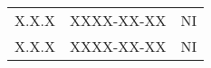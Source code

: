 {\begin{longtable}{ c C{10cm} c }
        
        X.X.X                  & XXXX-XX-XX                                       & NI\\
        X.X.X                  & XXXX-XX-XX                                       & NI\\
    \end{longtable}
}